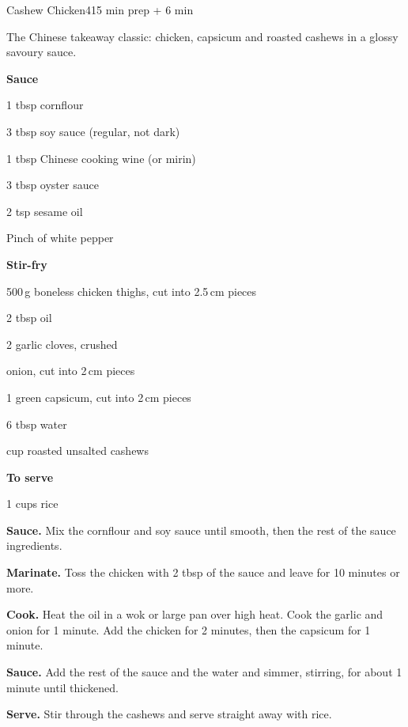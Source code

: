 \begin{recipebox}{Cashew Chicken}{4}{15 min prep + 6 min}

The Chinese takeaway classic: chicken, capsicum and roasted cashews in a glossy
savoury sauce.

\begin{ingredients}
  \item[] \textbf{Sauce}
  \item 1 tbsp cornflour
  \item 3 tbsp soy sauce (regular, not dark)
  \item 1 tbsp Chinese cooking wine (or mirin)
  \item 3 tbsp oyster sauce
  \item 2 tsp sesame oil
  \item Pinch of white pepper
  \item[] \textbf{Stir-fry}
  \item 500\,g boneless chicken thighs, cut into 2.5\,cm pieces
  \item 2 tbsp oil
  \item 2 garlic cloves, crushed
  \item {} onion, cut into 2\,cm pieces
  \item 1 green capsicum, cut into 2\,cm pieces
  \item 6 tbsp water
  \item {} cup roasted unsalted cashews
  \item[] \textbf{To serve}
  \item 1 cups rice
\end{ingredients}

\begin{method}
  \item \textbf{Sauce.} Mix the cornflour and soy sauce until smooth, then the rest of
        the sauce ingredients.
  \item \textbf{Marinate.} Toss the chicken with 2 tbsp of the sauce and leave for 10
        minutes or more.
  \item \textbf{Cook.} Heat the oil in a wok or large pan over high heat. Cook the
        garlic and onion for 1 minute. Add the chicken for 2 minutes, then the
        capsicum for 1 minute.
  \item \textbf{Sauce.} Add the rest of the sauce and the water and simmer, stirring,
        for about 1 minute until thickened.
  \item \textbf{Serve.} Stir through the cashews and serve straight away with rice.
\end{method}


\end{recipebox}
